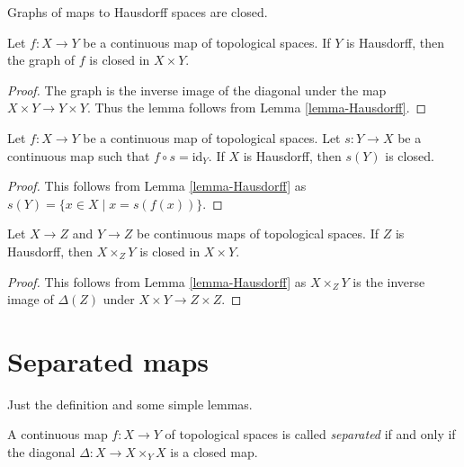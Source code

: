 \begin{lemma}
\label{lemma-graph-closed}
\begin{slogan}
Graphs of maps to Hausdorff spaces are closed.
\end{slogan}
Let $f : X \to Y$ be a continuous map of topological spaces.
If $Y$ is Hausdorff, then the graph of $f$ is closed in $X \times Y$.
\end{lemma}

\begin{proof}
The graph is the inverse image of the diagonal under the map
$X \times Y \to Y \times Y$. Thus the lemma follows from
Lemma \ref{lemma-Hausdorff}.
\end{proof}

\begin{lemma}
\label{lemma-section-closed}
Let $f : X \to Y$ be a continuous map of topological spaces.
Let $s : Y \to X$ be a continuous map such that $f \circ s = \text{id}_Y$.
If $X$ is Hausdorff, then $s(Y)$ is closed.
\end{lemma}

\begin{proof}
This follows from Lemma \ref{lemma-Hausdorff} as
$s(Y) = \{x \in X \mid x = s(f(x))\}$.
\end{proof}

\begin{lemma}
\label{lemma-fibre-product-closed}
Let $X \to Z$ and $Y \to Z$ be continuous maps of topological spaces.
If $Z$ is Hausdorff, then  $X \times_Z Y$ is closed in $X \times Y$.
\end{lemma}

\begin{proof}
This follows from Lemma \ref{lemma-Hausdorff} as
$X \times_Z Y$ is the inverse image of $\Delta(Z)$
under $X \times Y \to Z \times Z$.
\end{proof}




\section{Separated maps}
\label{section-separated}

\noindent
Just the definition and some simple lemmas.

\begin{definition}
\label{definition-separated}
A continuous map $f : X \to Y$ of topological spaces is called
{\it separated} if and only if the diagonal $\Delta : X \to X \times_Y X$
is a closed map.
\end{definition}

